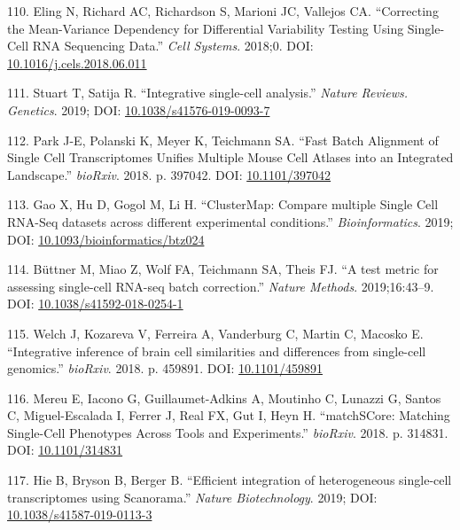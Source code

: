\documentclass[11pt,a4paper,titlepage,twoside,openright]{style/unimelbthesis}
\theoremstyle{definition}
\theoremstyle{definition}
\theoremstyle{definition}
\theoremstyle{remark}
\begin{document}
\begin{mainmatter}
\leavevmode\hypertarget{ref-Eling2018-lp}{}%
110. Eling N, Richard AC, Richardson S, Marioni JC, Vallejos CA. ``Correcting the Mean-Variance Dependency for Differential Variability Testing Using Single-Cell RNA Sequencing Data.'' \emph{Cell Systems}. 2018;0. DOI: \href{https://doi.org/10.1016/j.cels.2018.06.011}{10.1016/j.cels.2018.06.011}

\leavevmode\hypertarget{ref-Stuart2019-ua}{}%
111. Stuart T, Satija R. ``Integrative single-cell analysis.'' \emph{Nature Reviews. Genetics}. 2019; DOI: \href{https://doi.org/10.1038/s41576-019-0093-7}{10.1038/s41576-019-0093-7}

\leavevmode\hypertarget{ref-Park2018-ri}{}%
112. Park J-E, Polanski K, Meyer K, Teichmann SA. ``Fast Batch Alignment of Single Cell Transcriptomes Unifies Multiple Mouse Cell Atlases into an Integrated Landscape.'' \emph{bioRxiv}. 2018. p. 397042. DOI: \href{https://doi.org/10.1101/397042}{10.1101/397042}

\leavevmode\hypertarget{ref-Gao2019-ir}{}%
113. Gao X, Hu D, Gogol M, Li H. ``ClusterMap: Compare multiple Single Cell RNA-Seq datasets across different experimental conditions.'' \emph{Bioinformatics}. 2019; DOI: \href{https://doi.org/10.1093/bioinformatics/btz024}{10.1093/bioinformatics/btz024}

\leavevmode\hypertarget{ref-Buttner2019-yl}{}%
114. Büttner M, Miao Z, Wolf FA, Teichmann SA, Theis FJ. ``A test metric for assessing single-cell RNA-seq batch correction.'' \emph{Nature Methods}. 2019;16:43--9. DOI: \href{https://doi.org/10.1038/s41592-018-0254-1}{10.1038/s41592-018-0254-1}

\leavevmode\hypertarget{ref-Welch2018-gb}{}%
115. Welch J, Kozareva V, Ferreira A, Vanderburg C, Martin C, Macosko E. ``Integrative inference of brain cell similarities and differences from single-cell genomics.'' \emph{bioRxiv}. 2018. p. 459891. DOI: \href{https://doi.org/10.1101/459891}{10.1101/459891}

\leavevmode\hypertarget{ref-Mereu2018-bx}{}%
116. Mereu E, Iacono G, Guillaumet-Adkins A, Moutinho C, Lunazzi G, Santos C, Miguel-Escalada I, Ferrer J, Real FX, Gut I, Heyn H. ``matchSCore: Matching Single-Cell Phenotypes Across Tools and Experiments.'' \emph{bioRxiv}. 2018. p. 314831. DOI: \href{https://doi.org/10.1101/314831}{10.1101/314831}

\leavevmode\hypertarget{ref-Hie2019-er}{}%
117. Hie B, Bryson B, Berger B. ``Efficient integration of heterogeneous single-cell transcriptomes using Scanorama.'' \emph{Nature Biotechnology}. 2019; DOI: \href{https://doi.org/10.1038/s41587-019-0113-3}{10.1038/s41587-019-0113-3}


\end{mainmatter}
\end{document}
